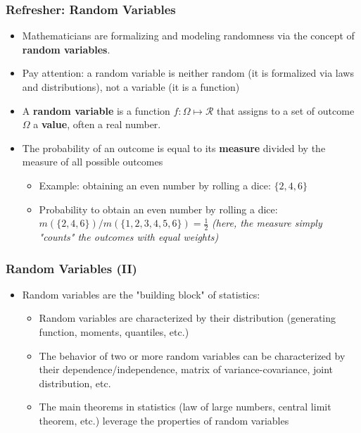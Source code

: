 \documentclass{beamer}
\begin{document}
\begin{frame}
  \frametitle{Refresher: Random Variables}
  \begin{itemize}
  \item Mathematicians are formalizing and modeling randomness via the concept of \textbf{random variables}.\\
  \item Pay attention: a random variable is neither random (it is formalized via laws and distributions), not a variable (it is a function)
  \item A \textbf{random variable} is a function $f: \Omega \mapsto \mathcal{R}$ that assigns to
      a set of outcome $\Omega$ a \textbf{value}, often a real number.
  \item The probability of an outcome is equal to its \textbf{measure} divided by
        the measure of all possible outcomes
     \begin{itemize}
      \item Example: obtaining an even number by rolling a dice: $\{2, 4, 6\}$
      \item Probability to obtain an even number by rolling a dice: $m(\{2, 4,
        6\})/m(\{1, 2, 3, 4, 5, 6\}) = \frac{1}{2}$ \emph{(here, the measure
          simply "counts" the outcomes with equal weights)}
        \end{itemize}     
  \end{itemize}  
\end{frame}

\begin{frame}
  \frametitle{Random Variables (II)}    
  \begin{itemize}
  \item Random variables are the "building block" of statistics:
    \begin{itemize}
    \item Random variables are characterized by their distribution (generating
      function, moments, quantiles, etc.)
    \item The behavior of two or more random variables can be characterized by
      their dependence/independence, matrix of variance-covariance, joint
      distribution, etc.
    \item The main theorems in statistics (law of large numbers, central limit
      theorem, etc.) leverage the properties of random variables
    \end{itemize}
  \end{itemize}
\end{frame}
\end{document}
